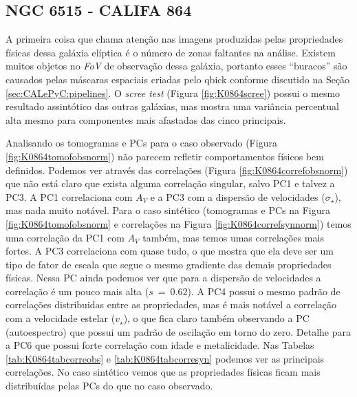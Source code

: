 \subsection{NGC 6515 - CALIFA 864}

A primeira coisa que chama atenção nas imagens produzidas pelas propriedades físicas dessa galáxia elíptica é o número
de zonas faltantes na análise. Existem muitos objetos no {\em FoV} de observação dessa galáxia, portanto esses
``buracos'' são causados pelas máscaras espaciais criadas pelo {\sc qbick} conforme discutido na Seção
\ref{sec:CALePyC:pipelines}. O {\em scree test} (Figura \ref{fig:K0864scree}) possui o mesmo resultado assintótico das
outras galáxias, mas mostra uma variância percentual alta mesmo para componentes mais afastadas das cinco principais.

Analisando os tomogramas e PCs para o caso observado (Figura \ref{fig:K0864tomofobsnorm}) não parecem refletir
comportamentos físicos bem definidos. Podemos ver através das correlações (Figura \ref{fig:K0864correfobsnorm}) que não
está claro que exista alguma correlação singular, salvo PC1 e talvez a PC3. A PC1 correlaciona com $A_V$ e a PC3 com a
dispersão de velocidades ($\sigma_\star$), mas nada muito notável. Para o caso sintético (tomogramas e PCs na Figura
\ref{fig:K0864tomofobsnorm} e correlações na Figura \ref{fig:K0864correfsynnorm}) temos uma correlação da PC1 com $A_V$
também, mas temos umas correlações mais fortes. A PC3 correlaciona com quase tudo, o que mostra que ela deve ser um tipo
de fator de escala que segue o mesmo gradiente das demais propriedades físicas. Nessa PC ainda podemos ver que para a
dispersão de velocidades a correlação é um pouco mais alta ($s\ =\ 0.62$). A PC4 possui o mesmo padrão de correlações
distribuidas entre as propriedades, mas é mais notável a correlação com a velocidade estelar ($v_\star$), o que fica
claro também observando a PC (autoespectro) que possui um padrão de oscilação em torno do zero. Detalhe para a PC6 que
possui forte correlação com idade e metalicidade. Nas Tabelas \ref{tab:K0864tabcorreobs} e \ref{tab:K0864tabcorresyn}
podemos ver as principais correlações. No caso sintético vemos que as propriedades físicas ficam mais distribuídas pelas
PCs do que no caso observado.

